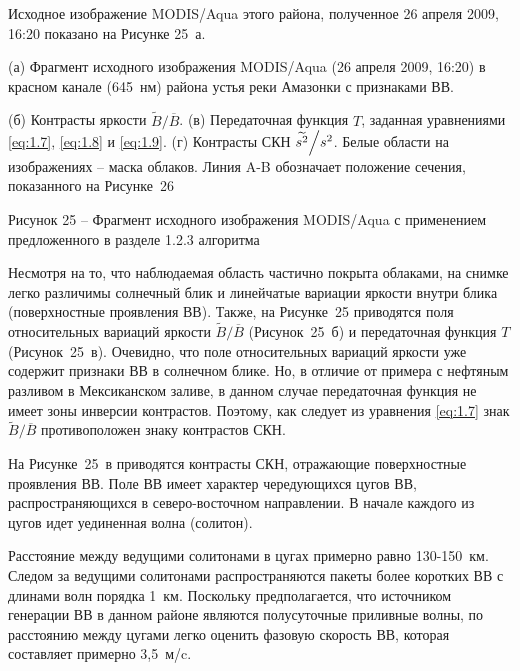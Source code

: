 Исходное изображение MODIS/Aqua этого района, полученное 26 апреля 2009, 16:20 показано на Рисунке 25~а.









(а) Фрагмент исходного изображения MODIS/Aqua (26 апреля 2009, 16:20) в красном канале (645~нм) района устья реки Амазонки с признаками ВВ.

(б) Контрасты яркости $\widetilde{B}/\overline{B}$. (в) Передаточная функция $T$, заданная уравнениями \eqref{eq:1.7}, \eqref{eq:1.8} и \eqref{eq:1.9}. (г) Контрасты СКН ${\widetilde{s^{2} }\mathord{\left/ {\vphantom {\widetilde{s^{2} } s^{2} }} \right. \kern-\nulldelimiterspace} s^{2} } $. Белые области на изображениях -- маска облаков. Линия A-B обозначает положение сечения, показанного на Рисунке~26



Рисунок 25 -- Фрагмент исходного изображения MODIS/Aqua с применением предложенного в разделе 1.2.3 алгоритма



Несмотря на то, что наблюдаемая область частично покрыта облаками, на снимке легко различимы солнечный блик и линейчатые вариации яркости внутри блика (поверхностные проявления ВВ). Также, на Рисунке~25 приводятся поля относительных вариаций яркости $\widetilde{B}/\overline{B}$ (Рисунок~25~б) и передаточная функция $T$ (Рисунок~25~в). Очевидно, что поле относительных вариаций яркости уже содержит признаки ВВ в солнечном блике. Но, в отличие от примера с нефтяным разливом в Мексиканском заливе, в данном случае передаточная функция не имеет зоны инверсии контрастов. Поэтому, как следует из уравнения \eqref{eq:1.7} знак $\widetilde{B}/\overline{B}$ противоположен знаку контрастов СКН.

На Рисунке~25~в приводятся контрасты СКН, отражающие поверхностные проявления ВВ. Поле ВВ имеет характер чередующихся цугов ВВ, распространяющихся в северо-восточном направлении. В начале каждого из цугов идет уединенная волна (солитон).

Расстояние между ведущими солитонами в цугах примерно равно 130-150~км. Следом за ведущими солитонами распространяются пакеты более коротких ВВ с длинами волн порядка 1~км. Поскольку предполагается, что источником генерации ВВ в данном районе являются полусуточные приливные волны, по расстоянию между цугами легко оценить фазовую скорость ВВ, которая составляет примерно 3,5~м/c.

